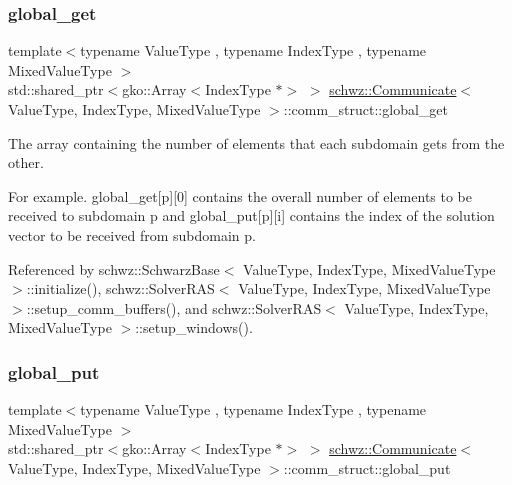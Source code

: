 \subsubsection{\texorpdfstring{global\+\_\+get}{global\_get}}
{\footnotesize\ttfamily template$<$typename Value\+Type , typename Index\+Type , typename Mixed\+Value\+Type $>$ \\
std\+::shared\+\_\+ptr$<$gko\+::\+Array$<$Index\+Type $\ast$$>$ $>$ \hyperlink{classschwz_1_1Communicate}{schwz\+::\+Communicate}$<$ Value\+Type, Index\+Type, Mixed\+Value\+Type $>$\+::comm\+\_\+struct\+::global\+\_\+get}



The array containing the number of elements that each subdomain gets from the other. 

For example. global\+\_\+get\mbox{[}p\mbox{]}\mbox{[}0\mbox{]} contains the overall number of elements to be received to subdomain p and global\+\_\+put\mbox{[}p\mbox{]}\mbox{[}i\mbox{]} contains the index of the solution vector to be received from subdomain p. 

Referenced by schwz\+::\+Schwarz\+Base$<$ Value\+Type, Index\+Type, Mixed\+Value\+Type $>$\+::initialize(), schwz\+::\+Solver\+R\+A\+S$<$ Value\+Type, Index\+Type, Mixed\+Value\+Type $>$\+::setup\+\_\+comm\+\_\+buffers(), and schwz\+::\+Solver\+R\+A\+S$<$ Value\+Type, Index\+Type, Mixed\+Value\+Type $>$\+::setup\+\_\+windows().

\mbox{\label{structschwz_1_1Communicate_1_1comm__struct_a9186bd26e5826aa6ad88c863798593ac}} 
\subsubsection{\texorpdfstring{global\+\_\+put}{global\_put}}
{\footnotesize\ttfamily template$<$typename Value\+Type , typename Index\+Type , typename Mixed\+Value\+Type $>$ \\
std\+::shared\+\_\+ptr$<$gko\+::\+Array$<$Index\+Type $\ast$$>$ $>$ \hyperlink{classschwz_1_1Communicate}{schwz\+::\+Communicate}$<$ Value\+Type, Index\+Type, Mixed\+Value\+Type $>$\+::comm\+\_\+struct\+::global\+\_\+put}



